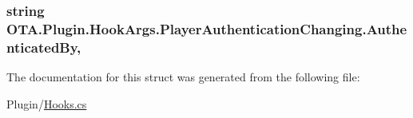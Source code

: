 \subsubsection[{Authenticated\+By}]{\setlength{\rightskip}{0pt plus 5cm}string O\+T\+A.\+Plugin.\+Hook\+Args.\+Player\+Authentication\+Changing.\+Authenticated\+By\hspace{0.3cm}{\ttfamily [get]}, {\ttfamily [set]}}\label{struct_o_t_a_1_1_plugin_1_1_hook_args_1_1_player_authentication_changing_acf989dbffe08e00632b55962fdd38a4f}


The documentation for this struct was generated from the following file\+:\begin{DoxyCompactItemize}
\item 
Plugin/\hyperlink{_hooks_8cs}{Hooks.\+cs}\end{DoxyCompactItemize}
